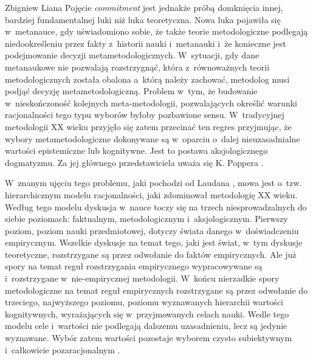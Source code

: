 \begin{artplenv}{Zbigniew Liana}
Pojęcie \textit{commitment} jest jednakże próbą domknięcia innej, bardziej fundamentalnej luki niż luka teoretyczna. Nowa luka pojawiła się w~metanauce, gdy uświadomiono sobie, że także teorie metodologiczne podlegają niedookreśleniu przez fakty z~historii nauki i~metanauki i~że konieczne jest podejmowanie decyzji metametodologicznych. W~sytuacji, gdy dane metanaukowe nie pozwalają rozstrzygnąć, która z~równoważnych teorii metodologicznych została obalona a~którą należy zachować, metodolog musi podjąć decyzję metametodologiczną. Problem w~tym, że budowanie w~nieskończoność kolejnych meta-metodologii, pozwalających określić warunki racjonalności tego typu wyborów byłoby pozbawione sensu. W~tradycyjnej metodologii XX wieku przyjęło się zatem przecinać ten regres przyjmując, że wybory metametodologiczne dokonywane są w~oparciu o~dalej nieuzasadnialne wartości epistemiczne lub kognitywne. Jest to postawa aksjologicznego dogmatyzmu. Za jej głównego przedstawiciela uważa się K. Poppera
\parencite[zob.][s.~12]{grobler_prawda_1993}.%


W~znanym ujęciu tego problemu, jaki pochodzi od Laudana
\parencite*[][]{laudan_science_1984}, %
 mowa jest o~tzw. hierarchicznym modelu racjonalności, jaki zdominował metodologię XX wieku. Według tego modelu dyskusja w~nauce toczy się na trzech niesprowadzalnych do siebie poziomach: faktualnym, metodologicznym i~aksjologicznym. Pierwszy poziom, poziom nauki przedmiotowej, dotyczy świata danego w~doświadczeniu empirycznym. Wszelkie dyskusje na temat tego, jaki jest świat, w~tym dyskusje teoretyczne, rozstrzygane są przez odwołanie do faktów empirycznych. Ale już spory na temat reguł rozstrzygania empirycznego wypracowywane są i~rozstrzygane w~nie-empirycznej metodologii. W~końcu nierzadkie spory metodologiczne na temat reguł empirycznych rozstrzygane są przez odwołanie do trzeciego, najwyższego poziomu, poziomu wyznawanych hierarchii wartości kognitywnych, wyrażających się w~przyjmowanych celach nauki. Wedle tego modelu cele i~wartości nie podlegają dalszemu uzasadnieniu, lecz są jedynie wyznawane. Wybór zatem wartości pozostaje wyborem czysto subiektywnym i~całkowicie pozaracjonalnym 
\parencites[zob.][s.~23-26.39-41.47-50]{laudan_science_1984}[][s.~20–22]{grobler_prawda_1993}.%



\end{artplenv}
